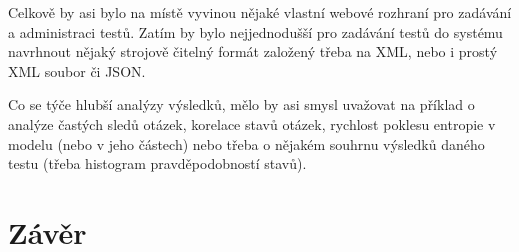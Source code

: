 \documentclass[a4paper,twoside,12pt]{scrbook}
\begin{document}
Celkově by asi bylo na místě vyvinou nějaké vlastní webové rozhraní pro zadávání a administraci testů. Zatím by bylo nejjednodušší pro zadávání testů do systému navrhnout nějaký strojově čitelný formát založený třeba na XML, nebo i prostý XML soubor či JSON.

Co se týče hlubší analýzy výsledků, mělo by asi smysl uvažovat na příklad o analýze častých sledů otázek, korelace stavů otázek, rychlost poklesu entropie v modelu (nebo v jeho částech) nebo třeba o nějakém souhrnu výsledků daného testu (třeba histogram pravděpodobností stavů).

\chapter*{Závěr} %
%
%
%


\clearpage  %
\end{document}
